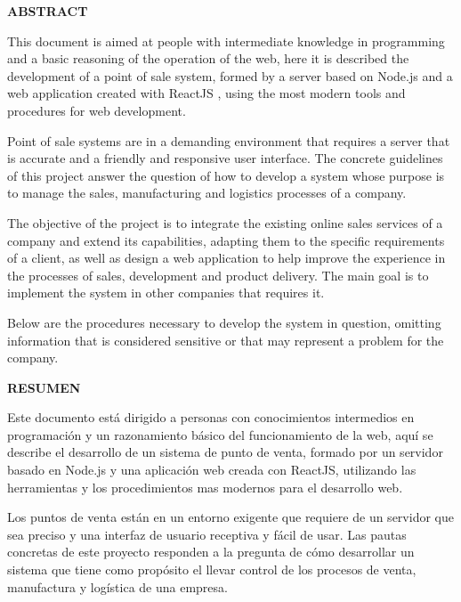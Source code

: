 \begin{center}
  {\Large \bf{ABSTRACT}}
\end{center}
This document is aimed at people with intermediate knowledge in programming and a basic reasoning of the operation of the web, here it is described the development of a point of sale system, formed by a server based on Node.js and a web application created with ReactJS , using the most modern tools and procedures for web development.
\vspace{0.8cm}

Point of sale systems are in a demanding environment that requires a server that is accurate and a friendly and responsive user interface. The concrete guidelines of this project answer the question of how to develop a system whose purpose is to manage the sales, manufacturing and logistics processes of a company.
\vspace{0.8cm}

The objective of the project is to integrate the existing online sales services of a company and extend its capabilities, adapting them to the specific requirements of a client, as well as design a web application to help improve the experience in the processes of sales, development and product delivery. The main goal is to implement the system in other companies that requires it.
\vspace{0.8cm}

Below are the procedures necessary to develop the system in question, omitting information that is considered sensitive or that may represent a problem for the company.

\newpage
\begin{center}
  {\Large \bf{RESUMEN}}
\end{center}
Este documento está dirigido a personas con conocimientos intermedios en programación y un razonamiento básico del funcionamiento de la web, aquí se describe el desarrollo de un sistema de punto de venta, formado por un servidor basado en Node.js y una aplicación web creada con ReactJS, utilizando las herramientas y los procedimientos mas modernos para el desarrollo web. 
\vspace{0.8cm}

Los puntos de venta están en un entorno exigente que requiere de un servidor que sea preciso y una interfaz de usuario receptiva y fácil de usar. Las pautas concretas de este proyecto responden a la pregunta de cómo desarrollar un sistema que tiene como propósito el llevar control de los procesos de venta, manufactura y logística de una empresa.
\vspace{0.8cm}

